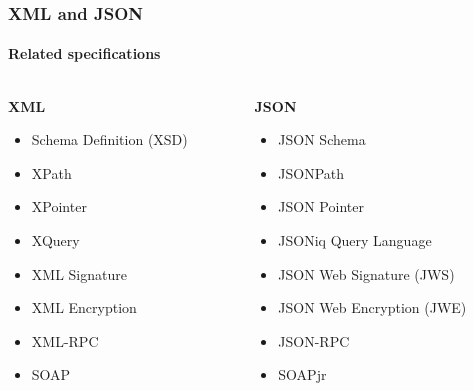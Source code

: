 \documentclass[
    alternativetitlepage=bild,
    cornerlogo=hgi_nds_logo2,
    sectionoverview,
]{rubpresentation}
\begin{document}
\begin{frame}[plain,t]
    \frametitle{XML and JSON}
    \framesubtitle{Related specifications}
    \begin{columns}[t]
        \begin{column}{0.5\textwidth}
            \begin{center}\textbf{\Large XML}\end{center}
            \begin{itemize}
                \item{} Schema Definition (XSD)\\
                \item{} XPath\\
                \item{} XPointer\\
                \item{} XQuery\\
                \item{} XML Signature\\
                \item{} XML Encryption\\
                \item{} XML-RPC\\
                \item{} SOAP
            \end{itemize}
        \end{column}
        \begin{column}{0.5\textwidth}
            \begin{center}\textbf{\Large JSON}\end{center}
            \begin{itemize}
                \item{} JSON Schema\\
                \item{} JSONPath\\
                \item{} JSON Pointer\\
                \item{} JSONiq Query Language\\
                \item{} JSON Web Signature (JWS)
                \item{} JSON Web Encryption (JWE)
                \item{} JSON-RPC\\
                \item{} SOAPjr\\

\end{itemize}
\end{column}
\end{columns}
\end{frame}
\end{document}

